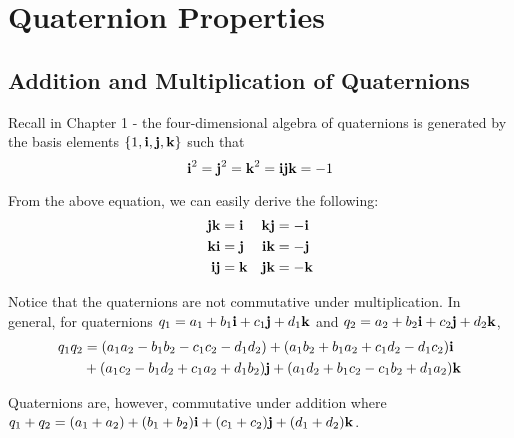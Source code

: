 \section{Quaternion Properties}

\subsection{Addition and Multiplication of Quaternions}

Recall in Chapter 1 - the four-dimensional algebra of quaternions is generated by the basis elements $\{1,\textbf{i},\textbf{j},\textbf{k}\}$ such that 
\begin{equation} \label{quat_eq}
\textbf{i}^2 = \textbf{j}^2 = \textbf{k}^2 = \textbf{i} \textbf{j} \textbf{k} = -1
\end{equation}

From the above equation, we can easily derive the following:
\begin{align*}
	\textbf{j}\textbf{k} &= \textbf{i} & \textbf{k}\textbf{j} &= -\textbf{i} \\
	\textbf{k}\textbf{i} &= \textbf{j} & \textbf{i}\textbf{k} &= -\textbf{j} \\
	\textbf{i}\textbf{j} &= \textbf{k} & \textbf{j}\textbf{k} &= -\textbf{k}
\end{align*}

Notice that the quaternions are not commutative under multiplication. In general, for quaternions $q_1 = a_1 + b_1\textbf{i} + c_1\textbf{j} + d_1\textbf{k}$ and $q_2 = a_2 + b_2\textbf{i} + c_2\textbf{j} + d_2\textbf{k}$, 
\begin{align*}
	q_1q_2 &= (a_1a_2 - b_1b_2 - c_1c_2 - d_1d_2) + (a_1b_2 + b_1a_2 + c_1d_2 - d_1c_2)\textbf{i} \\
		   &+ (a_1c_2 - b_1d_2 + c_1a_2 + d_1b_2)\textbf{j} + (a_1d_2 + b_1c_2 - c_1b_2 + d_1a_2)\textbf{k}
\end{align*}

Quaternions are, however, commutative under addition where $q_1+q_2 = (a_1+a_2) + (b_1+b_2)\textbf{i} + (c_1+c_2)\textbf{j} + (d_1+d_2)\textbf{k}$.

